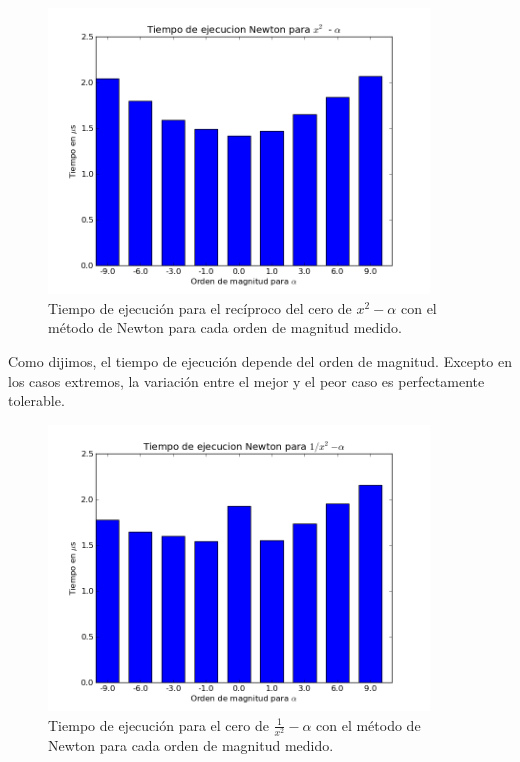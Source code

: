 \begin{figure}[H]
  \centering
    \includegraphics[width=0.9\textwidth]{../data/Tiempometodo0.png}
    \caption{Tiempo de ejecución para el recíproco del cero de $x^2 - \alpha$ con el método de Newton para cada orden de magnitud medido.}
    \label{tiempoMet0}
\end{figure}

Como dijimos, el tiempo de ejecución depende del orden de magnitud. Excepto en los casos extremos, la variación entre el mejor y el peor caso es perfectamente tolerable.

\begin{figure}[H]
  \centering
    \includegraphics[width=0.9\textwidth]{../data/Tiempometodo1.png}
    \caption{Tiempo de ejecución para el cero de $\frac{1}{x^2} - \alpha$ con el método de Newton para cada orden de magnitud medido.}
    \label{tiempoMet1}
\end{figure}

